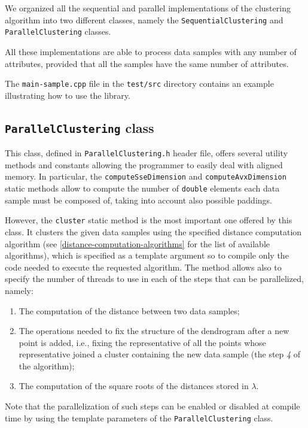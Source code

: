 \documentclass{article}
\begin{document}
We organized all the sequential and parallel implementations of the clustering algorithm into two
different classes, namely the \texttt{SequentialClustering} and \texttt{ParallelClustering} classes.

All these implementations are able to process data samples with any number of attributes,
provided that all the samples have the same number of attributes.

The \texttt{main-sample.cpp} file in the \texttt{test/src} directory contains an example
illustrating how to use the library.

\hypertarget{parallel-clustering}{%
\subsection{\texttt{ParallelClustering} class}
\label{parallel-clustering}}
This class, defined in \texttt{ParallelClustering.h} header file, offers several utility methods and
constants allowing the programmer to easily deal with aligned memory. In particular, the
\texttt{computeSseDimension} and \texttt{computeAvxDimension} static methods allow to compute the
number of \texttt{double} elements each data sample must be composed of, taking into account also
possible paddings.

However, the \texttt{cluster} static method is the most important one offered by this class. It
clusters
the given data samples using the specified distance computation algorithm (see
\ref{distance-computation-algorithms} for the list of available algorithms), which
is specified as a template argument so to compile only the code needed to execute the requested
algorithm.
The method allows also to specify the number of threads to use in each of the steps that can be
parallelized, namely:
\begin{enumerate}
\item The computation of the distance between two data samples;
\item The operations needed to fix the structure of the dendrogram after a new point is
added, i.e., fixing the representative of all the points whose representative joined a
cluster containing the new data sample (the step \textit{4} of the algorithm);
\item The computation of the square roots of the distances stored in $\lambda$.
\end{enumerate}
Note that the parallelization of such steps can be enabled or disabled at compile time by using the
template parameters of the \texttt{ParallelClustering} class.
\end{document}
